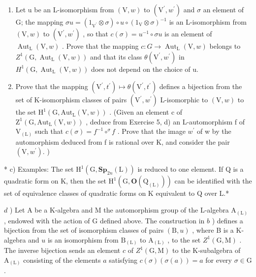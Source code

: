 \begin{enumerate}
\def\labelenumi{\alph{enumi})}
\item
  Let u be an L-isomorphism from \((\mathrm{V}, w)\) to \((\mathrm{V}^{\prime}, w^{\prime})\) and \(\sigma\) an element of G; the mapping \(\sigma u = (1_{\mathrm{V}^{\prime}} \otimes \sigma) \circ u \circ (1_{\mathrm{V}} \otimes \sigma)^{-1}\) is an L-isomorphism from \((\mathrm{V}, w)\) to \((\mathrm{V}^{\prime}, w^{\prime})\) , so that \(c(\sigma) = u^{-1} \circ \sigma u\) is an element of \(\operatorname{Aut}_{\mathrm{L}}(\mathrm{V}, w)\) . Prove that the mapping \(c : G \to \operatorname{Aut}_{\mathrm{L}}(\mathrm{V}, w)\) belongs to \(Z^{1}(\mathrm{G}, \operatorname{Aut}_{\mathrm{L}}(\mathrm{V}, w))\) and that its class \(\theta(\mathrm{V}^{\prime}, w^{\prime})\) in \(H^{1}(\mathrm{G}, \operatorname{Aut}_{\mathrm{L}}(\mathrm{V}, w))\) does not depend on the choice of u.
\item
  Prove that the mapping \((\mathrm{V}^{\prime},t^{\prime})\mapsto\theta(\mathrm{V}^{\prime},t^{\prime})\) defines a bijection from the set of K-isomorphism classes of pairs \((\mathrm{V}^{\prime},w^{\prime})\) L-isomorphic to \((\mathrm{V},w)\) to the set \(\mathrm{H}^{1}(\mathrm{G},\mathrm{Aut}_{\mathrm{L}}(\mathrm{V},w))\) . (Given an element c of \(\mathrm{Z}^{1}(\mathrm{G},\mathrm{Aut}_{\mathrm{L}}(\mathrm{V},w))\) , deduce from Exercise 5, d) an L-automorphism f of \(\mathrm{V}_{(\mathrm{L})}\) such that \(c(\sigma)=f^{-1}\circ^{\sigma}f\) . Prove that the image \(w^{\prime}\) of w by the automorphism deduced from f is rational over K, and consider the pair \((\mathrm{V},w^{\prime}).\) )
\end{enumerate}

* c) Examples: The set \(\mathrm{H}^1 (\mathrm{G},\mathbf{Sp}_{2n}(\mathrm{L}))\) is reduced to one element. If Q is a quadratic form on K, then the set \(\mathrm{H}^1 (\mathrm{G},\mathbf{O}(\mathrm{Q}_{(\mathrm{L})}))\) can be identified with the set of equivalence classes of quadratic forms on K equivalent to Q over L.*

\(d\) ) Let A be a K-algebra and M the automorphism group of the L-algebra \(\mathrm{A}_{(\mathrm{L})}\) , endowed with the action of G defined above. The construction in \(b\) ) defines a bijection from the set of isomorphism classes of pairs \((\mathrm{B},u)\) , where B is a K-algebra and \(u\) is an isomorphism from \(\mathrm{B}_{(\mathrm{L})}\) to \(\mathrm{A}_{(\mathrm{L})}\) , to the set \(Z^{1}(\mathrm{G},\mathrm{M})\) . The inverse bijection sends an element \(c\) of \(Z^{1}(\mathrm{G},\mathrm{M})\) to the K-subalgebra of \(\mathrm{A}_{(\mathrm{L})}\) consisting of the elements \(a\) satisfying \(c(\sigma)(\sigma(a)) = a\) for every \(\sigma \in \mathrm{G}\) .

